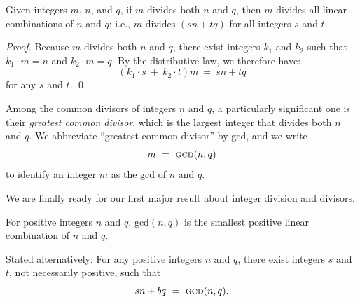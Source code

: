 \begin{prop}
\label{thm:m-common-divisor-nq}
Given integers $m$, $n$, and $q$, if $m$ divides both $n$ and $q$, then $m$ divides all linear combinations of $n$ and $q$; i.e., $m \mbox{ divides } (sn + tq)$ for all integers $s$ and $t$.
\end{prop}

\begin{proof}
Because $m$ divides both $n$ and $q$, there exist integers $k_1$ and $k_2$ such that $k_1 \cdot m = n$ and $k_2 \cdot m = q$.  By the distributive law, we therefore have:
\[ (k_1 \cdot s \ + \ k_2 \cdot t)m \ = \ sn+tq \]
for any $s$ and $t$.  \qed
\end{proof}

 
Among the common divisors of integers $n$ and $q$, a particularly significant one is their {\em greatest common divisor}, which is the largest integer that divides both $n$ and $q$.  We abbreviate ``greatest common divisor'' by {\sc gcd}, and we write
\[ m \ = \ \mbox{\sc gcd}(n, q) \]
to identify an integer $m$ as the {\sc gcd} of $n$ and $q$.

\smallskip

We are finally ready for our first major result about integer division and divisors.

\begin{prop}
\label{thm:gcd-n-linear}
For positive integers $n$ and $q$, {\sc gcd}$(n, q)$ is the smallest positive linear combination of $n$ and $q$.

\noindent
Stated alternatively: For any positive integers $n$ and $q$, there exist integers $s$ and $t$, not necessarily positive, such that
\[ sn + bq \ = \ \mbox{\sc gcd}(n, q). \]
\end{prop}

